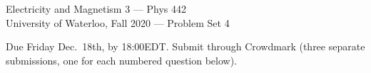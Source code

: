 \documentclass[12pt,geometry,width=8in]{article}
\begin{document}
\chead{}
\renewcommand{\headrulewidth}{0pt}

\begin{center}
  {\large
    Electricity and Magnetism 3 --- Phys 442  \\
    University of Waterloo, Fall 2020
    --- Problem Set 4
    \par
  }
\end{center}

\vspace{0.1in}

Due Friday Dec.~18th, by 18:00EDT.  Submit through Crowdmark (three separate submissions, one for each numbered question below).

\vspace{0.1in}

\noindent
\end{document}
